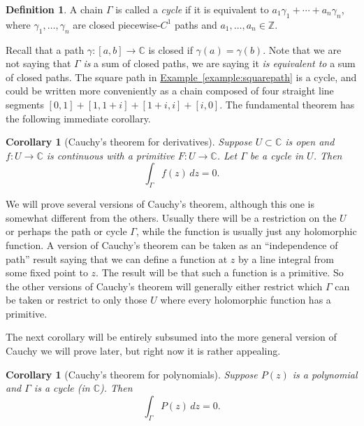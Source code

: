 \documentclass[12pt,openany]{book}
\newcommand{\C}{{\mathbb{C}}}
\newcommand{\Z}{{\mathbb{Z}}}
\newcommand{\myindex}[1]{#1\index{#1}}
\newcommand{\myquote}[1]{``#1''}
\theoremstyle{plain}
\newtheorem{cor}[thm]{Corollary}
\theoremstyle{remark}
\theoremstyle{definition}
\newtheorem{defn}[thm]{Definition}
\theoremstyle{exercise}
\theoremstyle{example}
\newcommand{\exampleref}[1]{\hyperref[#1]{Example~\ref*{#1}}}
\begin{document}
\begin{defn}
A chain $\Gamma$ 
is called a \emph{\myindex{cycle}} if
it is equivalent to
$a_1 \gamma_1 + \cdots + a_n \gamma_n$, where $\gamma_1, \ldots, \gamma_n$
are closed piecewise-$C^1$ paths
and $a_1,\ldots,a_n \in \Z$.
\end{defn}

Recall that a path $\gamma \colon [a,b] \to \C$ is closed if $\gamma(a) = \gamma(b)$.
Note that we are not saying that $\Gamma$ \emph{is} a sum of closed
paths, we are saying it
\emph{is equivalent to} a sum of closed paths.  The square path in
\exampleref{example:squarepath} is a cycle, and could be written more
conveniently as a chain composed of four straight line segments $[0,1] +
[1,1+i]+[1+i,i]+[i,0]$.
The fundamental theorem has the following
immediate corollary.

\begin{cor}[Cauchy's theorem for derivatives] \label{cor:cauchyforders}
Suppose $U \subset \C$ is open and $f \colon U \to \C$
is continuous with a primitive
$F \colon U \to \C$.
Let $\Gamma$ be
a cycle
in $U$.
Then
\begin{equation*}
\int_\Gamma f(z) \, dz = 0 .
\end{equation*}
\end{cor}

We will prove several versions of Cauchy's theorem, although this one is
somewhat different from the others.  Usually there will be a restriction on
the $U$ or perhaps the path or cycle $\Gamma$,
while the function is usually just any holomorphic function.
A version of Cauchy's theorem can be taken as an \myquote{independence of path}
result saying that we can define a function at $z$ by a line integral
from some fixed point to $z$.  The result will be that such a function is a
primitive.  So the other versions of Cauchy's theorem will generally
either restrict which $\Gamma$ can be taken or
restrict to only those $U$ where every holomorphic function has a primitive.

The next corollary will be entirely
subsumed into the more general version of Cauchy we will prove later,
but right now it is rather appealing.

\begin{cor}[Cauchy's theorem for polynomials] \label{cor:cauchyforpoly}
Suppose $P(z)$ is a polynomial and $\Gamma$ is
a cycle (in $\C$).
Then
\begin{equation*}
\int_\Gamma P(z) \, dz = 0 .
\end{equation*}
\end{cor}
\end{document}
